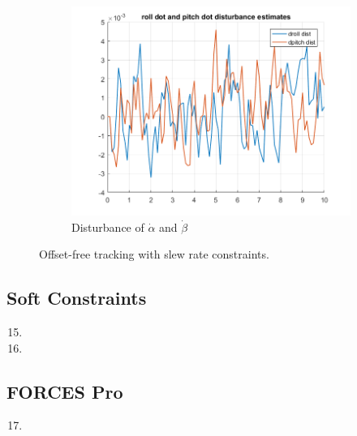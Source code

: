 \documentclass[11pt]{article}
\begin{document}
\begin{enumerate}
\begin{figure}[ht]
\begin{subfigure}[c]{0.3\linewidth}
            \includegraphics[width=\linewidth]{Plots_14_SlewRateConstraints/10}
            \caption{Disturbance of $\dot{\alpha}$ and $\dot{\beta}$}
        \end{subfigure}
        \caption{Offset-free tracking with slew rate constraints.}
        \label{fig:slew_rate}
\end{figure}
\end{enumerate}



\subsection*{Soft Constraints} %
\label{sub:soft_constraints}

\begin{enumerate}
    \setcounter{enumi}{14}
    \item

    \item

\end{enumerate}



\subsection*{FORCES Pro} %
\label{sub:forces_pro}

\begin{enumerate}
    \setcounter{enumi}{16}
    \item
\end{enumerate}

\end{document}
